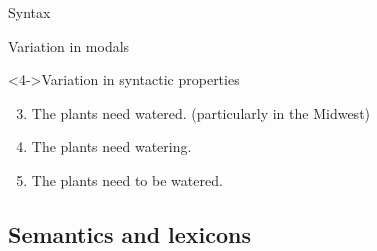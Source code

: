 \documentclass{beamer}
\newcommand{\subonefive}{Syntax}
\newcommand{\subonesix}{Semantics and lexicons}
\begin{document}
\begin{frame}[t]{\subonefive}
{\begin{block}{Variation in modals}
          \end{block}
          \begin{block}<4->{Variation in syntactic properties}
            \begin{enumerate}
              \setcounter{enumi}{2}
              \item The plants need watered. (particularly in the Midwest)
              \item The plants need watering.
              \item The plants need to be watered.
            \end{enumerate}
          \end{block}
        }
      \end{frame}

    \subsection{\subonesix}
\end{document}
